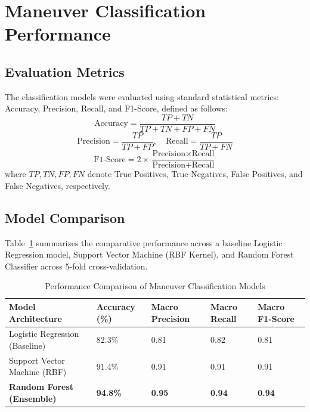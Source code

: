 \section{Maneuver Classification Performance}
\label{sec:ml_results}

\subsection{Evaluation Metrics}
The classification models were evaluated using standard statistical metrics: Accuracy, Precision, Recall, and F1-Score, defined as follows:
\begin{equation}
    \text{Accuracy} = \frac{TP + TN}{TP + TN + FP + FN}
\end{equation}
\begin{equation}
    \text{Precision} = \frac{TP}{TP + FP}, \quad \text{Recall} = \frac{TP}{TP + FN}
\end{equation}
\begin{equation}
    \text{F1-Score} = 2 \times \frac{\text{Precision} \times \text{Recall}}{\text{Precision} + \text{Recall}}
\end{equation}
where $TP, TN, FP, FN$ denote True Positives, True Negatives, False Positives, and False Negatives, respectively.

\subsection{Model Comparison}
Table~\ref{tab:model_comparison} summarizes the comparative performance across a baseline Logistic Regression model, Support Vector Machine (RBF Kernel), and Random Forest Classifier across 5-fold cross-validation.

\begin{table}[H]
\centering
\small
\caption{Performance Comparison of Maneuver Classification Models}
\label{tab:model_comparison}
\begin{tabularx}{\textwidth}{lXXXX}
\hline
\textbf{Model Architecture} & \textbf{Accuracy (\%)} & \textbf{Macro Precision} & \textbf{Macro Recall} & \textbf{Macro F1-Score} \\
\hline
Logistic Regression (Baseline) & 82.3\% & 0.81 & 0.82 & 0.81 \\
Support Vector Machine (RBF)   & 91.4\% & 0.91 & 0.91 & 0.91 \\
\textbf{Random Forest (Ensemble)} & \textbf{94.8\%} & \textbf{0.95} & \textbf{0.94} & \textbf{0.94} \\
\hline
\end{tabularx}
\end{table}

